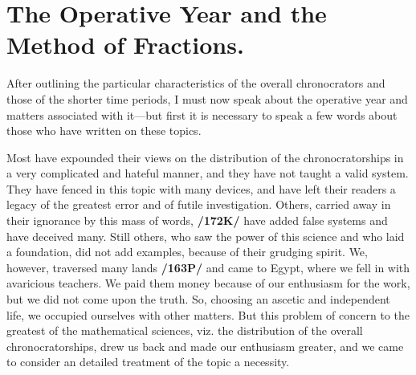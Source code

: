 \section{The Operative Year and the Method of Fractions.}

After outlining the particular characteristics of the overall chronocrators and those of the shorter time periods, I must now speak about the operative year and matters associated with it—but first it is necessary to speak a few words about those who have written on these topics. 

Most have expounded their views on the distribution of the chronocratorships in a very complicated and hateful manner, and they have not taught
a valid system. They have fenced in this topic with many devices, and have left their readers a legacy of the greatest error and of futile investigation. Others, carried away in their ignorance by this mass of words, \textbf{/172K/} have added false systems and have deceived many. Still others, who saw the power of this science and who laid a foundation, did not add examples, because of their grudging spirit. We, however, traversed many lands \textbf{/163P/} and came to Egypt, where we fell in with avaricious teachers. We paid them money because of our enthusiasm for the work, but we did not come upon the truth. So, choosing an ascetic and independent life, we occupied ourselves with other matters. But this problem of concern to the greatest of the mathematical sciences, viz. the distribution of the overall chronocratorships, drew us back and made our enthusiasm greater, and we came to consider an detailed treatment of the topic a necessity.


